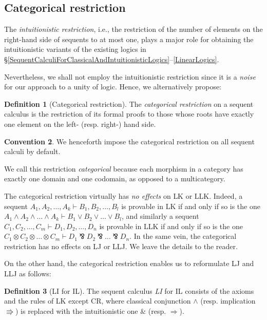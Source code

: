 \documentclass[a4paper]{article}
\theoremstyle{definition}
\newtheorem{definition}{Definition}[section]
\newtheorem{convention}[definition]{Convention}
\theoremstyle{theorem}
\theoremstyle{remark}
\begin{document}
\subsection{Categorical restriction}
\label{CategoricalRestriction}
The \emph{intuitionistic restriction}, i.e., the restriction of the number of elements on the right-hand side of sequents to at most one, plays a major role for obtaining the intuitionistic variants of the existing logics in \S\ref{SequentCalculiForClassicalAndIntuitionisticLogics}--\ref{LinearLogics}.

Nevertheless, we shall not employ the intuitionistic restriction since it is a \emph{noise} for our approach to a unity of logic.
Hence, we alternatively propose:

\begin{definition}[Categorical restriction]
\label{DefCategoricalRestriction}
The \emph{categorical restriction} on a sequent calculus is the restriction of its formal proofs to those whose roots have exactly one element on the left- (resp. right-) hand side.
\end{definition}

\begin{convention}
We henceforth impose the categorical restriction on all sequent calculi by default.
\end{convention}

We call this restriction \emph{categorical} because each morphism in a category has exactly one domain and one codomain, as opposed to a multicategory.

The categorical restriction virtually has \emph{no effects} on \textsf{LK} or \textsf{LLK}.
Indeed, a sequent $A_1, A_2, \dots, A_k \vdash B_1, B_2, \dots, B_l$ is provable in \textsf{LK} if and only if so is the one $A_1 \wedge A_2 \wedge \dots \wedge A_k \vdash B_1 \vee B_2 \vee \dots \vee B_l$, and similarly a sequent $C_1, C_2, \dots, C_m \vdash D_1, D_2, \dots, D_n$ is provable in \textsf{LLK} if and only if so is the one $C_1 \otimes C_2 \otimes \dots \otimes C_m \vdash D_1 \invamp D_2 \invamp \dots \invamp D_n$.
In the same vein, the categorical restriction has no effects on \textsf{LJ} or \textsf{LLJ}.
We leave the details to the reader.

On the other hand, the categorical restriction enables us to reformulate \textsf{LJ} and \textsf{LLJ} as follows:

\begin{definition}[\textsf{LI} for IL]
\label{DefLI}
The sequent calculus \emph{\textsf{LI}} for IL consists of the axioms and the rules of \textsf{LK} except CR, where classical conjunction $\wedge$ (resp. implication $\Rrightarrow$) is replaced with the intuitionistic one $\&$ (resp. $\Rightarrow$).
\end{definition}
\end{document}
